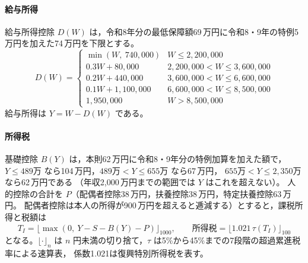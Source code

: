 \documentclass[paper=a4,fontsize=10pt]{jlreq}
\newcommand{\man}{\,万円}
\begin{document}
\paragraph{給与所得}
給与所得控除 $D(W)$ は，令和8年分の最低保障額69\man に令和8・9年の特例5\man を加えた74\man を下限とする\cite{nta,taikou2026}。
\begin{equation}
  D(W)=
  \begin{cases}
    \min(W,\ 740{,}000) & W \le 2{,}200{,}000\\
    0.3W + 80{,}000 & 2{,}200{,}000 < W \le 3{,}600{,}000\\
    0.2W + 440{,}000 & 3{,}600{,}000 < W \le 6{,}600{,}000\\
    0.1W + 1{,}100{,}000 & 6{,}600{,}000 < W \le 8{,}500{,}000\\
    1{,}950{,}000 & W > 8{,}500{,}000
  \end{cases}
\end{equation}
給与所得は $Y = W - D(W)$ である。

\paragraph{所得税}
基礎控除 $B(Y)$ は，本則62\man に令和8・9年分の特例加算を加えた額で，
$Y\le 489\text{万}$ なら104\man，$489\text{万}<Y\le 655\text{万}$ なら67\man，
$655\text{万}<Y\le 2{,}350\text{万}$ なら62\man である\cite{nta}
（年収2,000\man までの範囲では $Y$ はこれを超えない）。
人的控除の合計を $P$（配偶者控除38\man，扶養控除38\man，特定扶養控除63\man。
配偶者控除は本人の所得が900\man を超えると逓減する）とすると，課税所得と税額は
\begin{equation}
  T_I = \bigl\lfloor \max(0,\ Y - S - B(Y) - P) \bigr\rfloor_{1000},\qquad
  \text{所得税} = \bigl\lfloor 1.021\,\tau(T_I) \bigr\rfloor_{100}
\end{equation}
となる。$\lfloor\cdot\rfloor_{n}$ は $n$ 円未満の切り捨て，$\tau$ は5\%から45\%までの7段階の超過累進税率による速算表，
係数1.021は復興特別所得税を表す。
\end{document}
